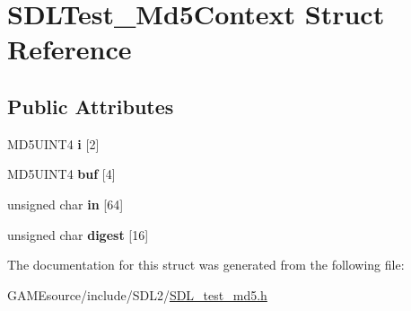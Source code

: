 \hypertarget{struct_s_d_l_test___md5_context}{}\section{S\+D\+L\+Test\+\_\+\+Md5\+Context Struct Reference}
\label{struct_s_d_l_test___md5_context}
\subsection*{Public Attributes}
\begin{DoxyCompactItemize}
\item 
\mbox{\label{struct_s_d_l_test___md5_context_a95b3d5fd74fd1b7a27bf96f3bb32beb4}} 
M\+D5\+U\+I\+N\+T4 {\bfseries i} \mbox{[}2\mbox{]}
\item 
\mbox{\label{struct_s_d_l_test___md5_context_a061f0cead7ec49ac4c5baf0bbd9c13a7}} 
M\+D5\+U\+I\+N\+T4 {\bfseries buf} \mbox{[}4\mbox{]}
\item 
\mbox{\label{struct_s_d_l_test___md5_context_a337638ef799dc0ad9397ea9b175ea388}} 
unsigned char {\bfseries in} \mbox{[}64\mbox{]}
\item 
\mbox{\label{struct_s_d_l_test___md5_context_ab29079997a9f35e5d52c2aac3ad28f90}} 
unsigned char {\bfseries digest} \mbox{[}16\mbox{]}
\end{DoxyCompactItemize}


The documentation for this struct was generated from the following file\+:\begin{DoxyCompactItemize}
\item 
G\+A\+M\+Esource/include/\+S\+D\+L2/\mbox{\hyperlink{_s_d_l__test__md5_8h}{S\+D\+L\+\_\+test\+\_\+md5.\+h}}\end{DoxyCompactItemize}
